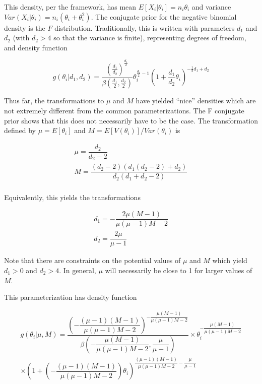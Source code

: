 \documentclass[12pt,epsfig]{article}
\begin{document}
\noindent This density, per the framework, has mean $E[X_i | \theta_i] = n_i \theta_i$ and variance $Var(X_i | \theta_i) = n_i (\theta_i + \theta_i^2)$. The conjugate prior for the negative binomial density is the $F$ distribution. Traditionally, this is written with parameters $d_1$ and $d_2$ (with $d_2 > 4$ so that the variance is finite), representing degrees of freedom, and density function

\begin{equation*}
 g(\theta_i | d_1, d_2) = \dfrac{(\frac{d_1}{d_2})^{\frac{d_1}{2}}}{\beta(\frac{d_1}{2}, \frac{d_2}{2})} \theta_i^{\frac{d_1}{2}-1}\left(1 + \frac{d_1}{d_2}\theta_i\right)^{-\frac12{d_1 + d_2}}
\end{equation*}


Thus far, the transformations to $\mu$ and $M$ have yielded ``nice'' densities which are not extremely different from the common parameterizations. The F conjugate prior shows that this does not necessarily have to be the case. The transformation defined by $\mu = E[\theta_i]$ and $M = E[V(\theta_i)]/Var(\theta_i)$ is


\begin{gather*}
    \mu = \dfrac{d_2}{d_2 - 2}\\ 
    M = \dfrac{(d_2 - 2)(d_1(d_2 - 2) + d_2)}{d_2(d_1 + d_2 - 2)}\\
\end{gather*}

Equivalently, this yields the transformations

\begin{gather*}
    d_1 = - \dfrac{2 \mu (M - 1)}{\mu(\mu - 1)M - 2}\\
    d_2 = \dfrac{2\mu}{\mu - 1}
\end{gather*}

\noindent Note that there are constraints on the potential values of $\mu$ and $M$ which yield $d_1 > 0$ and $d_2 > 4$. In general, $\mu$ will necessarily be close to 1 for larger values of $M$.

This parameterization has density function

\begin{multline*}
    g(\theta_i | \mu, M) = \dfrac{\left(-\dfrac{(\mu-1)(M-1)}{\mu(\mu-1)M-2}\right)^{-\dfrac{\mu(M-1)}{\mu(\mu-1)M - 2}}}{\beta \left(-\dfrac{\mu(M-1)}{\mu(\mu-1) M - 2}, \dfrac{\mu}{\mu-1}\right)} \times \theta_i^{-\dfrac{\mu(M-1)}{\mu(\mu-1)M - 2}} \\ \times \left(1 + \left(-\dfrac{(\mu-1)(M-1)}{\mu(\mu-1)M-2}\right) \theta_i\right)^{\dfrac{(\mu-1)(M-1)}{\mu(\mu-1)M-2} - \dfrac{\mu}{\mu - 1}}\\
\end{multline*}
\end{document}
